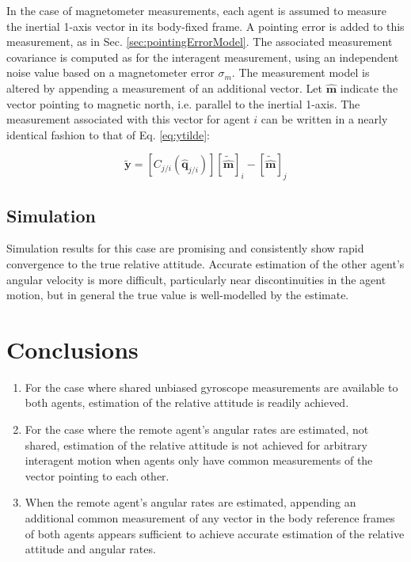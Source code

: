 \documentclass{aiaa-tc}
\newcommand{\br}[2]{[#1]_{#2}} %
\newcommand{\B}[1]{\textbf{#1}} %
\newcommand{\U}[1]{\hat{\textbf{#1}}} %
\begin{document}
In the case of magnetometer measurements, each agent is assumed to measure the inertial 1-axis vector in its body-fixed frame. A pointing error is added to this measurement, as in Sec. \ref{sec:pointingErrorModel}. The associated measurement covariance is computed as for the interagent measurement, using an independent noise value based on a magnetometer error $\sigma_m$. The measurement model is altered by appending a measurement of an additional vector. Let $\U{m}$ indicate the vector pointing to magnetic north, i.e. parallel to the inertial 1-axis. The measurement associated with this vector for agent $i$ can be written in a nearly identical fashion to that of Eq. \ref{eq:ytilde}:

\begin{equation}
\tilde{\B{y}} = [C_{j/i}(\hat{\B{q}}_{j/i})]\br{\tilde{\U{m}}}{i} - \br{\tilde{\U{m}}}{j}
\end{equation}

\subsection{Simulation}

Simulation results for this case are promising and consistently show rapid convergence to the true relative attitude. Accurate estimation of the other agent's angular velocity is more difficult, particularly near discontinuities in the agent motion, but in general the true value is well-modelled by the estimate.

\section{Conclusions}

\begin{enumerate}
\item For the case where shared unbiased gyroscope measurements are available to both agents, estimation of the relative attitude is readily achieved.
\item For the case where the remote agent's angular rates are estimated, not shared, estimation of the relative attitude is not achieved for arbitrary interagent motion when agents only have common measurements of the vector pointing to each other.
\item When the remote agent's angular rates are estimated, appending an additional common measurement of any vector in the body reference frames of both agents appears sufficient to achieve accurate estimation of the relative attitude and angular rates.
\end{enumerate}

%

%
\end{document}
